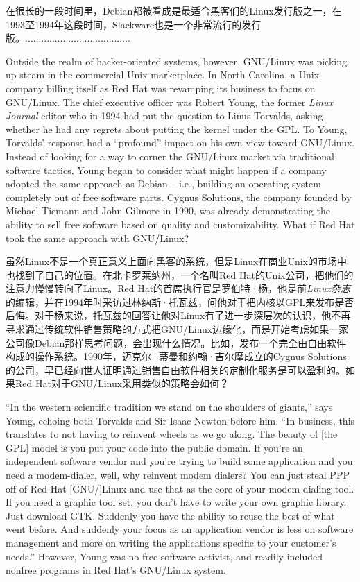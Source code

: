 \ifdefined\chs
在很长的一段时间里，Debian都被看成是最适合黑客们的Linux发行版之一，在1993至1994年这段时间，Slackware也是一个非常流行的发行版。.......................................
\fi

\ifdefined\eng
Outside the realm of hacker-oriented systems, however, GNU/Linux was picking up steam in the commercial Unix marketplace. In North Carolina, a Unix company billing itself as Red Hat was revamping its business to focus on GNU/Linux. The chief executive officer was Robert Young, the former \textit{Linux Journal} editor who in 1994 had put the question to Linus Torvalds, asking whether he had any regrets about putting the kernel under the GPL. To Young, Torvalds' response had a ``profound'' impact on his own view toward GNU/Linux. Instead of looking for a way to corner the GNU/Linux market via traditional software tactics, Young began to consider what might happen if a company adopted the same approach as Debian -- i.e., building an operating system completely out of free software parts. Cygnus Solutions, the company founded by Michael Tiemann and John Gilmore in 1990, was already demonstrating the ability to sell free software based on quality and customizability. What if Red Hat took the same approach with GNU/Linux?
\fi

\ifdefined\chs
虽然Linux不是一个真正意义上面向黑客的系统，但是Linux在商业Unix的市场中也找到了自己的位置。在北卡罗莱纳州，一个名叫Red Hat的Unix公司，把他们的注意力慢慢转向了Linux。Red Hat的首席执行官是罗伯特·杨，他是前\textit{Linux杂志}的编辑，并在1994年时采访过林纳斯·托瓦兹，问他对于把内核以GPL来发布是否后悔。对于杨来说，托瓦兹的回答让他对Linux有了进一步深层次的认识，他不再寻求通过传统软件销售策略的方式把GNU/Linux边缘化，而是开始考虑如果一家公司像Debian那样思考问题，会出现什么情况。比如，发布一个完全由自由软件构成的操作系统。1990年，迈克尔·蒂曼和约翰·吉尔摩成立的Cygnus Solutions的公司，早已经向世人证明通过销售自由软件相关的定制化服务是可以盈利的。如果Red Hat对于GNU/Linux采用类似的策略会如何？

\fi

\ifdefined\eng
``In the western scientific tradition we stand on the shoulders of giants,'' says Young, echoing both Torvalds and Sir Isaac Newton before him. ``In business, this translates to not having to reinvent wheels as we go along. The beauty of [the GPL] model is you put your code into the public domain. If you're an independent software vendor and you're trying to build some application and you need a modem-dialer, well, why reinvent modem dialers? You can just steal PPP off of Red Hat [GNU/]Linux and use that as the core of your modem-dialing tool. If you need a graphic tool set, you don't have to write your own graphic library. Just download GTK. Suddenly you have the ability to reuse the best of what went before. And suddenly your focus as an application vendor is less on software management and more on writing the applications specific to your customer's needs.'' However, Young was no free software activist, and readily included nonfree programs in Red Hat's GNU/Linux system.
\fi

